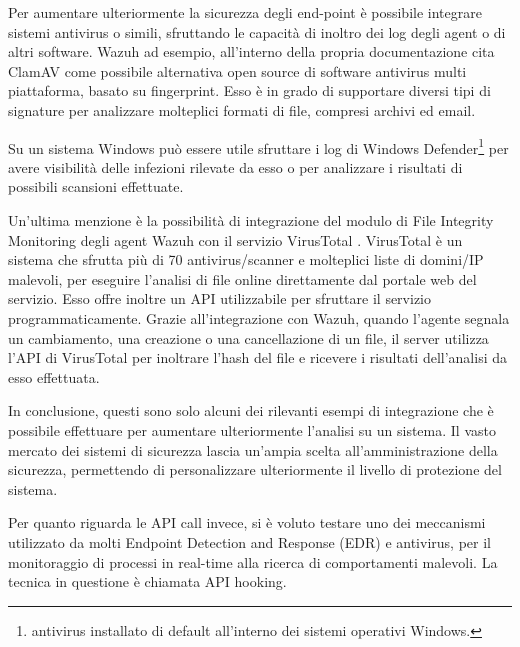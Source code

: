 \medskip


Per aumentare ulteriormente la sicurezza degli end-point è possibile integrare sistemi antivirus o simili, sfruttando le capacità di inoltro dei log degli agent o di altri software.  Wazuh ad esempio, all'interno della propria documentazione cita ClamAV \cite{clamav} come possibile alternativa open source di software antivirus multi piattaforma, basato su fingerprint. Esso è in grado di supportare diversi tipi di signature per analizzare molteplici formati di file, compresi archivi ed email.

Su un sistema Windows può essere utile sfruttare i log di Windows Defender\footnote{antivirus installato di default all'interno dei sistemi operativi Windows.} per avere visibilità delle infezioni rilevate da esso o per analizzare i risultati di possibili scansioni effettuate.

Un'ultima menzione è la possibilità di integrazione del modulo di File Integrity Monitoring degli agent Wazuh con il servizio VirusTotal \cite{virustotal}. VirusTotal è un sistema che sfrutta più di 70 antivirus/scanner e molteplici liste di domini/IP malevoli, per eseguire l'analisi di file online direttamente dal portale web del servizio. Esso offre inoltre un API utilizzabile per sfruttare il servizio programmaticamente. Grazie all'integrazione con Wazuh, quando l'agente segnala un cambiamento, una creazione o una cancellazione di un file, il server  utilizza l'API di VirusTotal per inoltrare l'hash del file e ricevere i risultati dell'analisi da esso effettuata.

In conclusione, questi sono solo alcuni dei rilevanti esempi di integrazione che è possibile effettuare per aumentare ulteriormente l'analisi su un sistema. Il vasto mercato dei sistemi di sicurezza lascia un'ampia scelta all'amministrazione della sicurezza, permettendo di personalizzare ulteriormente il livello di protezione del sistema.


\medskip

 
\label{apihooking}
Per quanto riguarda le API call invece, si è voluto testare  uno dei meccanismi utilizzato da molti  Endpoint Detection and Response (EDR) e antivirus, per il monitoraggio di  processi in real-time alla ricerca di comportamenti malevoli.  
La tecnica in questione è chiamata API hooking. 

